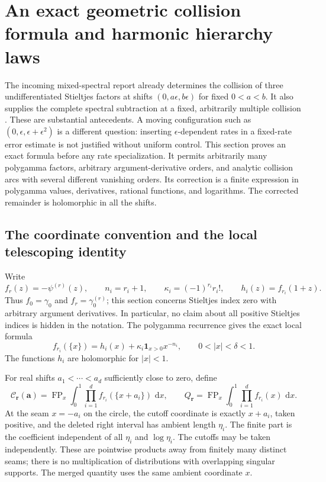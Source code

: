 \documentclass[11pt,a4paper]{article}
\numberwithin{equation}{section}
\theoremstyle{definition}
\theoremstyle{remark}
\DeclareMathOperator{\FP}{FP}
\newcommand{\dd}{\,\mathrm d}
\begin{document}
\section{An exact geometric collision formula and harmonic hierarchy laws}
\label{hc:section}

The incoming mixed-spectral report already determines the collision of
three undifferentiated Stieltjes factors at shifts $(0,a\epsilon,b\epsilon)$
for fixed $0<a<b$. It also supplies the complete spectral subtraction
at a fixed, arbitrarily multiple collision \cite{RepoMixed}. These are
substantial antecedents. A moving configuration such as
$(0,\epsilon,\epsilon+\epsilon^2)$ is a different question: inserting
$\epsilon$-dependent rates in a fixed-rate error estimate is not justified
without uniform control. This section proves an exact formula before
any rate specialization. It permits arbitrarily many polygamma factors,
arbitrary argument-derivative orders, and analytic collision arcs with
several different vanishing orders. Its correction is a finite expression
in polygamma values, derivatives, rational functions, and logarithms.
The corrected remainder is holomorphic in all the shifts.

\subsection{The coordinate convention and the local telescoping identity}

Write
\[
 f_r(z)=-\psi^{(r)}(z),\qquad
 n_i=r_i+1,\qquad \kappa_i=(-1)^{r_i}r_i!,\qquad
 h_i(z)=f_{r_i}(1+z).
\]
Thus $f_0=\gamma_0$ and $f_r=\gamma_0^{(r)}$; this section concerns
Stieltjes index zero with arbitrary argument derivatives. In particular,
no claim about all positive Stieltjes indices is hidden in the notation.
The polygamma recurrence \cite{DLMFPolygamma} gives the exact local formula
\begin{equation}\label{hc:one-sided}
 f_{r_i}(\{x\})=h_i(x)+
       \kappa_i\mathbf1_{x>0}x^{-n_i},\qquad 0<|x|<\delta<1.
\end{equation}
The functions $h_i$ are holomorphic for $|x|<1$.

For real shifts $a_1<\cdots<a_d$ sufficiently close to zero, define
\begin{equation}\label{hc:Cdef}
 \mathcal C_{\boldsymbol r}(\boldsymbol a)
 =\FP_x\int_0^1\prod_{i=1}^d f_{r_i}(\{x+a_i\})\,\dd x,
 \qquad
 Q_{\boldsymbol r}=\FP_x\int_0^1\prod_{i=1}^d f_{r_i}(x)\,\dd x.
\end{equation}
At the seam $x=-a_i$ on the circle, the cutoff coordinate is exactly
$x+a_i$, taken positive, and the deleted right interval has ambient
length $\eta_i$. The finite part is the coefficient independent of all
$\eta_i$ and $\log\eta_i$. The cutoffs may be taken independently.
These are pointwise products away from finitely many distinct seams;
there is no multiplication of distributions with overlapping singular
supports. The merged quantity uses the same ambient coordinate $x$.
\end{document}
